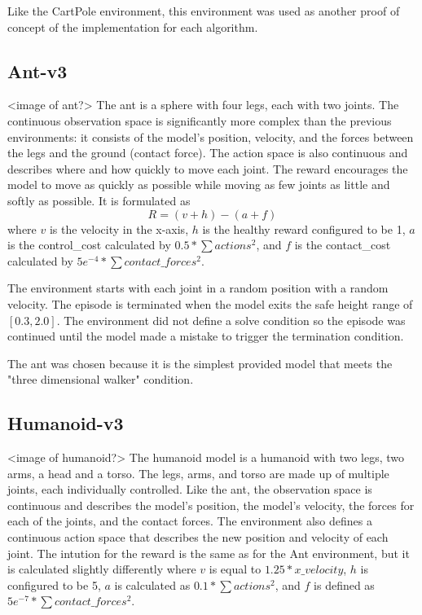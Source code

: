 \documentclass[conference]{IEEEtran}
\begin{document}
Like the CartPole environment, this environment was used as another proof of concept of the implementation for each
algorithm.

\subsection{Ant-v3}

<image of ant?>
The ant is a sphere with four legs, each with two joints. The continuous observation space is significantly more
complex than the previous environments: it consists of the model's position, velocity, and the forces between the legs
and the ground (contact force). The action space is also continuous and describes where and how quickly to move each
joint. The reward encourages the model to move as quickly as possible while moving as few joints as little and softly as
possible. It is formulated as
$$
R = (v + h) - (a + f)
$$
where $v$ is the velocity in the x-axis, $h$ is the healthy reward configured to be 1, $a$ is the control\_cost
calculated by $0.5* \sum actions^{2}$, and $f$ is the contact\_cost calculated by
$5e^{-4} * \sum contact\_forces^{2}$.

The environment starts with each joint in a random position with a random velocity. The episode is terminated when the
model exits the safe height range of $[0.3, 2.0]$. The environment did not define a solve condition so the episode was
continued until the model made a mistake to trigger the termination condition.

The ant was chosen because it is the simplest provided model that meets the "three dimensional walker" condition.

\subsection{Humanoid-v3}

<image of humanoid?>
The humanoid model is a humanoid with two legs, two arms, a head and a torso. The legs, arms, and torso are made up of
multiple joints, each individually controlled. Like the ant, the observation space is continuous and describes the
model's position, the model's velocity, the forces for each of the joints, and the contact forces. The environment also
defines a continuous action space that describes the new position and velocity of each joint. The intution for the
reward is the same as for the Ant environment, but it is calculated slightly differently where $v$ is equal to
$1.25 * x\_velocity$, $h$ is configured to be 5, $a$ is calculated as $0.1 * \sum actions^{2}$, and $f$ is defined as
$5e^{-7} * \sum contact\_forces^{2}$.
\end{document}
